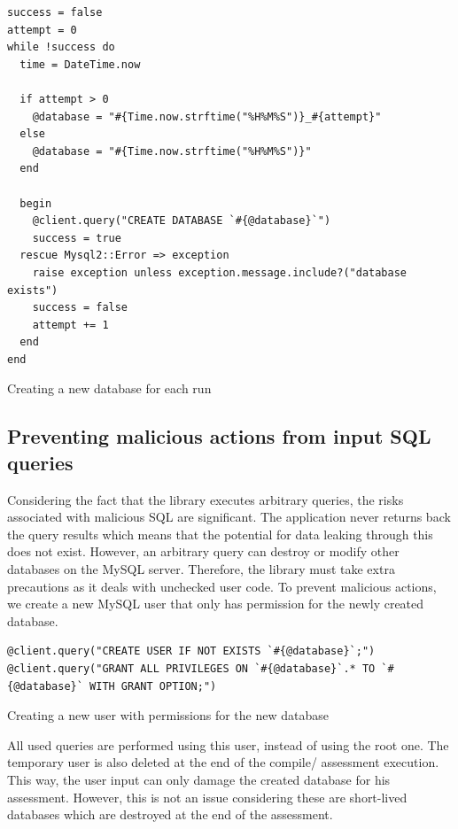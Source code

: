 \begin{code}
    \begin{verbatim}
success = false
attempt = 0
while !success do
  time = DateTime.now

  if attempt > 0
    @database = "#{Time.now.strftime("%H%M%S")}_#{attempt}"
  else
    @database = "#{Time.now.strftime("%H%M%S")}"
  end

  begin
    @client.query("CREATE DATABASE `#{@database}`")
    success = true
  rescue Mysql2::Error => exception
    raise exception unless exception.message.include?("database exists")
    success = false
    attempt += 1
  end
end
\end{verbatim}
    \caption{Creating a new database for each run}
    \label{fig:creating_new_database}
\end{code}

\subsection{Preventing malicious actions from input SQL queries}

Considering the fact that the library executes arbitrary queries, the risks associated with malicious SQL are significant. The application never returns back the query results which means that the potential for data leaking through this does not exist. However, an arbitrary query can destroy or modify other databases on the MySQL server. Therefore, the library must take extra precautions as it deals with unchecked user code. To prevent malicious actions, we create a new MySQL user that only has permission for the newly created database.

\begin{code}
\begin{verbatim}
@client.query("CREATE USER IF NOT EXISTS `#{@database}`;")
@client.query("GRANT ALL PRIVILEGES ON `#{@database}`.* TO `#{@database}` WITH GRANT OPTION;")
\end{verbatim}
\caption{Creating a new user with permissions for the new database}
\label{fig:creating_new_user}
\end{code}

All used queries are performed using this user, instead of using the root one. The temporary user is also deleted at the end of the compile/ assessment execution. This way, the user input can only damage the created database for his assessment. However, this is not an issue considering these are short-lived databases which are destroyed at the end of the assessment.


